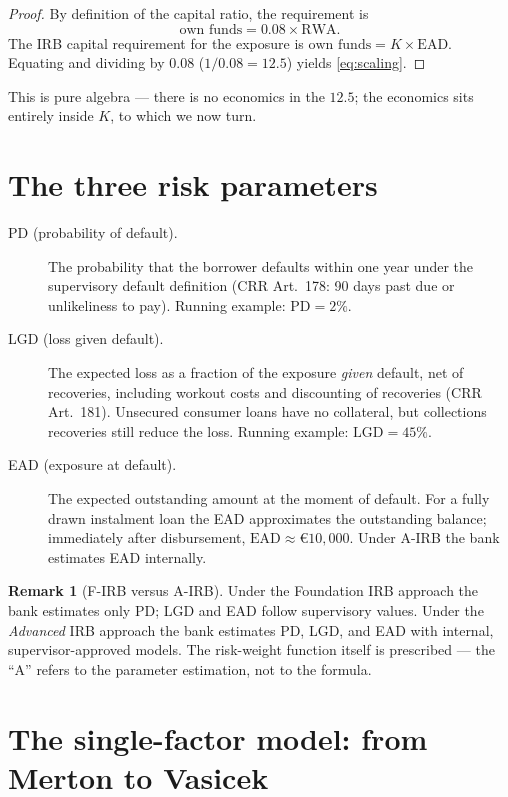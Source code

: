 \documentclass[11pt,a4paper]{report}
\renewcommand{\EUR}[1]{\euro#1}
\theoremstyle{definition}
\newtheorem{remark}[definition]{Remark}
\theoremstyle{plain}
\newcommand{\PD}{\mathrm{PD}}
\newcommand{\LGD}{\mathrm{LGD}}
\newcommand{\EAD}{\mathrm{EAD}}
\newcommand{\RWA}{\mathrm{RWA}}
\begin{document}
\begin{proof}
By definition of the capital ratio, the requirement is
\begin{equation}
  \text{own funds} = 0.08 \times \RWA .
\end{equation}
The IRB capital requirement for the exposure is
$\text{own funds} = K \times \EAD$. Equating and dividing by $0.08$
($1/0.08 = 12.5$) yields \eqref{eq:scaling}.
\end{proof}

This is pure algebra --- there is no economics in the $12.5$; the economics
sits entirely inside $K$, to which we now turn.

\section{The three risk parameters}

\begin{description}
\item[PD (probability of default).] The probability that the borrower
      defaults within one year under the supervisory default definition
      (CRR Art.~178: 90 days past due or unlikeliness to pay). Running
      example: $\PD=2\%$.
\item[LGD (loss given default).] The expected loss as a fraction of the
      exposure \emph{given} default, net of recoveries, including
      workout costs and discounting of recoveries (CRR Art.~181).
      Unsecured consumer loans have no collateral, but collections
      recoveries still reduce the loss. Running example: $\LGD=45\%$.
\item[EAD (exposure at default).] The expected outstanding amount at the
      moment of default. For a fully drawn instalment loan the EAD
      approximates the outstanding balance; immediately after
      disbursement, $\EAD\approx\EUR{10{,}000}$. Under A-IRB the bank
      estimates EAD internally.
\end{description}

\begin{remark}[F-IRB versus A-IRB]
Under the Foundation IRB approach the bank estimates only PD; LGD and
EAD follow supervisory values. Under the \emph{Advanced} IRB approach
the bank estimates PD, LGD, and EAD with internal, supervisor-approved
models. The risk-weight function itself is prescribed --- the ``A''
refers to the parameter estimation, not to the formula.
\end{remark}

\section{The single-factor model: from Merton to Vasicek}
\end{document}

